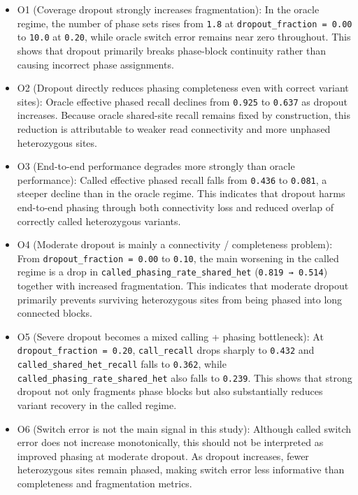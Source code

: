 \documentclass[
]{article}
\begin{document}
\begin{itemize}
\item
  O1 (Coverage dropout strongly increases fragmentation): In the oracle
  regime, the number of phase sets rises from \texttt{1.8} at
  \texttt{dropout\_fraction\ =\ 0.00} to \texttt{10.0} at \texttt{0.20},
  while oracle switch error remains near zero throughout. This shows
  that dropout primarily breaks phase-block continuity rather than
  causing incorrect phase assignments.
\item
  O2 (Dropout directly reduces phasing completeness even with correct
  variant sites): Oracle effective phased recall declines from
  \texttt{0.925} to \texttt{0.637} as dropout increases. Because oracle
  shared-site recall remains fixed by construction, this reduction is
  attributable to weaker read connectivity and more unphased
  heterozygous sites.
\item
  O3 (End-to-end performance degrades more strongly than oracle
  performance): Called effective phased recall falls from \texttt{0.436}
  to \texttt{0.081}, a steeper decline than in the oracle regime. This
  indicates that dropout harms end-to-end phasing through both
  connectivity loss and reduced overlap of correctly called heterozygous
  variants.
\item
  O4 (Moderate dropout is mainly a connectivity / completeness problem):
  From \texttt{dropout\_fraction\ =\ 0.00} to \texttt{0.10}, the main
  worsening in the called regime is a drop in
  \texttt{called\_phasing\_rate\_shared\_het} (\texttt{0.819\ →\ 0.514})
  together with increased fragmentation. This indicates that moderate
  dropout primarily prevents surviving heterozygous sites from being
  phased into long connected blocks.
\item
  O5 (Severe dropout becomes a mixed calling + phasing bottleneck): At
  \texttt{dropout\_fraction\ =\ 0.20}, \texttt{call\_recall} drops
  sharply to \texttt{0.432} and \texttt{called\_shared\_het\_recall}
  falls to \texttt{0.362}, while
  \texttt{called\_phasing\_rate\_shared\_het} also falls to
  \texttt{0.239}. This shows that strong dropout not only fragments
  phase blocks but also substantially reduces variant recovery in the
  called regime.
\item
  O6 (Switch error is not the main signal in this study): Although
  called switch error does not increase monotonically, this should not
  be interpreted as improved phasing at moderate dropout. As dropout
  increases, fewer heterozygous sites remain phased, making switch error
  less informative than completeness and fragmentation metrics.
\end{itemize}
\end{document}
